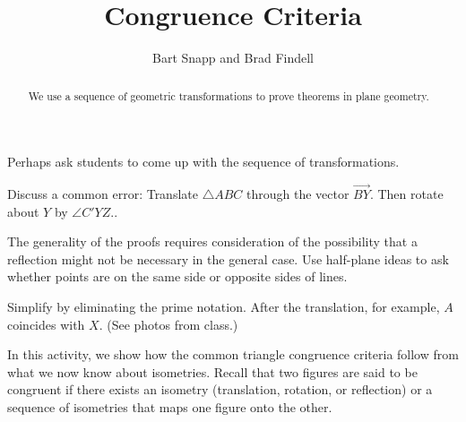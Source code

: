 \documentclass[nooutcomes]{ximera}
\title{Congruence Criteria}
\author{Bart Snapp and Brad Findell}
\begin{document}
\begin{abstract}
  We use a sequence of geometric transformations to prove theorems in
  plane geometry.
\end{abstract}
\maketitle

\begin{teachingnote}
Perhaps ask students to come up with the sequence of transformations. 

Discuss a common error:   Translate $\triangle ABC$ through the vector $\overrightarrow{BY}$.  Then rotate about $Y$ by $\angle C'YZ.$. 

The generality of the proofs requires consideration of the possibility that a reflection might not be necessary in the general case.  Use half-plane ideas to ask whether points are on the same side or opposite sides of lines.  

Simplify by eliminating the prime notation.  After the translation, for example, $A$ coincides with $X$.  (See photos from class.)
\end{teachingnote}

In this activity, we show how the common triangle congruence criteria follow from
 what we now know about isometries.%
 Recall that two figures are said to be 
congruent if there exists an isometry (translation, rotation, or reflection) or a 
sequence of isometries that maps one figure onto the other.  
\end{document}
